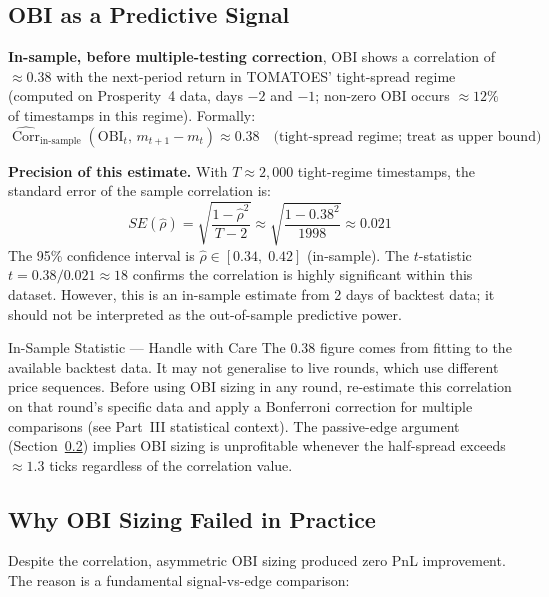 \documentclass[12pt,a4paper,openany]{report}
\theoremstyle{definition}
\newcommand{\Corr}{\operatorname{Corr}}
\begin{document}
\subsection{OBI as a Predictive Signal}

\textbf{In-sample, before multiple-testing correction}, OBI shows a correlation of $\approx 0.38$ with the next-period return in TOMATOES' tight-spread regime (computed on Prosperity~4 data, days $-2$ and $-1$; non-zero OBI occurs $\approx 12\%$ of timestamps in this regime). Formally:
\[
  \widehat{\Corr}_{\text{in-sample}}(\text{OBI}_t,\, m_{t+1} - m_t) \approx 0.38 \quad \text{(tight-spread regime; treat as upper bound)}
\]

\textbf{Precision of this estimate.} With $T \approx 2{,}000$ tight-regime timestamps, the standard error of the sample correlation is:
\[
  SE(\hat{\rho}) = \sqrt{\frac{1 - \hat{\rho}^2}{T - 2}} \approx \sqrt{\frac{1 - 0.38^2}{1998}} \approx 0.021
\]
The 95\% confidence interval is $\hat{\rho} \in [0.34,\; 0.42]$ (in-sample). The $t$-statistic $t = 0.38 / 0.021 \approx 18$ confirms the correlation is highly significant within this dataset. However, this is an in-sample estimate from 2 days of backtest data; it should not be interpreted as the out-of-sample predictive power.

\begin{warningbox}{In-Sample Statistic — Handle with Care}
The 0.38 figure comes from fitting to the available backtest data. It may not generalise to live rounds, which use different price sequences. Before using OBI sizing in any round, re-estimate this correlation on that round's specific data and apply a Bonferroni correction for multiple comparisons (see Part~III statistical context). The passive-edge argument (Section~\ref{sec:obi-sizing-failed}) implies OBI sizing is unprofitable whenever the half-spread exceeds $\approx 1.3$ ticks regardless of the correlation value.
\end{warningbox}

\subsection{Why OBI Sizing Failed in Practice}
\label{sec:obi-sizing-failed}

Despite the correlation, asymmetric OBI sizing produced zero PnL improvement. The reason is a fundamental signal-vs-edge comparison:
\end{document}
